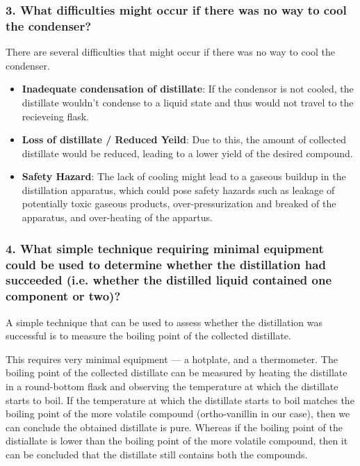 \documentclass[letterpaper,12pt]{article}
\begin{document}
\subsubsection*{3. What difficulties might occur if there was no way to cool the condenser?
}
There are several difficulties that might occur if there was no way to cool the condenser.
\begin{itemize}
    \item \textbf{Inadequate condensation of distillate}: If the condensor is not cooled, the distillate wouldn't condense to a liquid state and thus would not travel to the recieveing flask.
    \item \textbf{Loss of distillate / Reduced Yeild}: Due to this, the amount of collected distillate would be reduced, leading to a lower yield of the desired compound.
    \item \textbf{Safety Hazard}: The lack of cooling might lead to a gaseous buildup in the distillation apparatus, which could pose safety hazards such as leakage of potentially toxic gaseous products, over-pressurization and breaked of the apparatus, and over-heating of the appartus.
\end{itemize}

\subsubsection*{4. What simple technique requiring minimal equipment could be used to determine whether the distillation had succeeded (i.e. whether the distilled liquid contained one component or two)?
}
A simple technique that can be used to assess whether the distillation was successful is to measure the boiling point of the collected distillate.

This requires very minimal equipment --- a hotplate, and a thermometer. The boiling point of the collected distillate can be measured by heating the distillate in a round-bottom flask and observing the temperature at which the distillate starts to boil. If the temperature at which the distillate starts to boil matches the boiling point of the more volatile compound (ortho-vanillin in our case), then we can conclude the obtained distillate is pure. Whereas if the boiling point of the distiallate is lower than the boiling point of the more volatile compound, then it can be concluded that the distillate still contains both the compounds.
\end{document}
